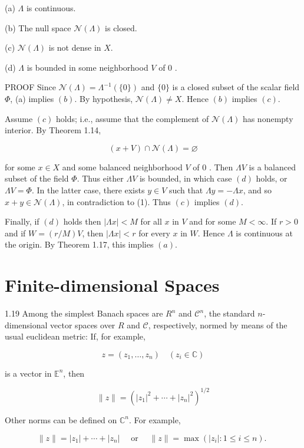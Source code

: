 \documentclass[10pt]{article}
\begin{document}
(a) $\Lambda$ is continuous.

(b) The null space $\mathcal{N}(\Lambda)$ is closed.

(c) $\mathcal{N}(\Lambda)$ is not dense in $X$.

(d) $\Lambda$ is bounded in some neighborhood $V$ of 0 .

PROOF Since $\mathscr{N}(\Lambda)=\Lambda^{-1}(\{0\})$ and $\{0\}$ is a closed subset of the scalar field $\Phi$, (a) implies $(b)$. By hypothesis, $\mathscr{N}(\Lambda) \neq X$. Hence $(b)$ implies $(c)$.

Assume $(c)$ holds; i.e., assume that the complement of $\mathscr{N}(\Lambda)$ has nonempty interior. By Theorem 1.14,

$$
(x+V) \cap \mathscr{N}(\Lambda)=\varnothing
$$

for some $x \in X$ and some balanced neighborhood $V$ of 0 . Then $\Lambda V$ is a balanced subset of the field $\Phi$. Thus either $\Lambda V$ is bounded, in which case $(d)$ holds, or $\Lambda V=\Phi$. In the latter case, there exists $y \in V$ such that $\Lambda y=-\Lambda x$, and so $x+y \in \mathcal{N}(\Lambda)$, in contradiction to (1). Thus $(c)$ implies $(d)$.

Finally, if $(d)$ holds then $|\Lambda x|<M$ for all $x$ in $V$ and for some $M<\infty$. If $r>0$ and if $W=(r / M) V$, then $|\Lambda x|<r$ for every $x$ in $W$. Hence $\Lambda$ is continuous at the origin. By Theorem 1.17, this implies $(a)$.

\section{Finite-dimensional Spaces}
1.19 Among the simplest Banach spaces are $R^{n}$ and $\mathscr{C}^{n}$, the standard $n$-dimensional vector spaces over $R$ and $\mathscr{C}$, respectively, normed by means of the usual euclidean metric: If, for example,

$$
z=\left(z_{1}, \ldots, z_{n}\right) \quad\left(z_{i} \in \mathbb{C}\right)
$$

is a vector in $\mathbb{E}^{n}$, then

$$
\|z\|=\left(\left|z_{1}\right|^{2}+\cdots+\left|z_{n}\right|^{2}\right)^{1 / 2}
$$

Other norms can be defined on $\mathbb{C}^{n}$. For example,

$$
\|z\|=\left|z_{1}\right|+\cdots+\left|z_{n}\right| \quad \text { or } \quad\|z\|=\max \left(\left|z_{i}\right|: 1 \leq i \leq n\right) \text {. }
$$
\end{document}
